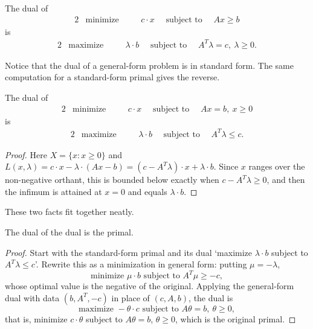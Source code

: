 \begin{proposition}
    The dual of
    \begin{alignat*}{2}
        & \text{minimize} \quad && c\cdot x \quad\text{ subject to } \quad Ax \geq b
    \end{alignat*}
    is
    \begin{alignat*}{2}
        & \text{maximize} \quad && \lambda \cdot b \quad\text{ subject to }\quad A^T\lambda = c,\ \lambda \geq 0.
    \end{alignat*}
\end{proposition}

Notice that the dual of a general-form problem is in standard form. The same computation for a standard-form primal gives the reverse.

\begin{proposition}
    The dual of
    \begin{alignat*}{2}
        & \text{minimize} \quad && c\cdot x \quad\text{ subject to } \quad Ax = b,\ x \geq 0
    \end{alignat*}
    is
    \begin{alignat*}{2}
        & \text{maximize} \quad && \lambda \cdot b \quad\text{ subject to }\quad A^T\lambda \leq c.
    \end{alignat*}
\end{proposition}
\begin{proof}
    Here $X = \{x : x \geq 0\}$ and $L(x,\lambda) = c\cdot x - \lambda\cdot(Ax - b) = (c - A^T\lambda)\cdot x + \lambda\cdot b$. Since $x$ ranges over the non-negative orthant, this is bounded below exactly when $c - A^T\lambda \geq 0$, and then the infimum is attained at $x = 0$ and equals $\lambda\cdot b$.
\end{proof}

These two facts fit together neatly.

\begin{proposition}
    The dual of the dual is the primal.
\end{proposition}
\begin{proof}
    Start with the standard-form primal and its dual `maximize $\lambda\cdot b$ subject to $A^T\lambda \leq c$'. Rewrite this as a minimization in general form: putting $\mu = -\lambda$,
    $$
    \text{minimize } \mu\cdot b \text{ subject to } A^T\mu \geq -c,
    $$
    whose optimal value is the negative of the original. Applying the general-form dual with data $(b, A^T, -c)$ in place of $(c, A, b)$, the dual is
    $$
    \text{maximize } -\theta\cdot c \text{ subject to } A\theta = b,\ \theta \geq 0,
    $$
    that is, minimize $c\cdot\theta$ subject to $A\theta = b$, $\theta \geq 0$, which is the original primal.
\end{proof}

